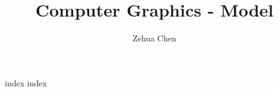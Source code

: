 \documentclass[letterpaper, 11pt]{report}
\title{Computer Graphics - Model}
\author{Zehua Chen}
\begin{document}
  \maketitle
  \tableofcontents

  \setmainstyles

  {index}
  {index}
\end{document}
